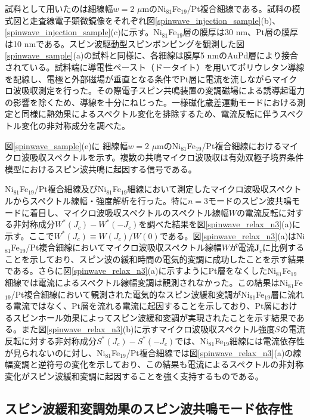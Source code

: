 試料として用いたのは細線幅$w=2$ $\mu$mのNi$_{81}$Fe$_{19}$/Pt複合細線である。試料の模式図と走査線電子顕微鏡像をそれぞれ図\ref{spinwave_injection_sample}(b)、\ref{spinwave_injection_sample}(c)に示す。Ni$_{81}$Fe$_{19}$層の膜厚は30 nm、Pt層の膜厚は10 nmである。スピン波駆動型スピンポンピングを観測した図\ref{spinwave_sample}(a)の試料と同様に、各細線は膜厚5 nmのAuPd層により接合されている。試料端に導電性ペースト（ドータイト）を用いてポリウレタン導線を配線し、電極と外部磁場が垂直となる条件でPt層に電流を流しながらマイクロ波吸収測定を行った。その際電子スピン共鳴装置の変調磁場による誘導起電力の影響を除くため、導線を十分にねじった。一様磁化歳差運動モードにおける測定と同様に熱効果によるスペクトル変化を排除するため、電流反転に伴うスペクトル変化の非対称成分を調べた。




図\ref{spinwave_sample}(e)に 細線幅$w=2$ $\mu$mのNi$_{81}$Fe$_{19}$/Pt複合細線におけるマイクロ波吸収スペクトルを示す。複数の共鳴マイクロ波吸収は有効双極子境界条件模型におけるスピン波共鳴に起因する信号である。



Ni$_{81}$Fe$_{19}$/Pt複合細線及びNi$_{81}$Fe$_{19}$細線において測定したマイクロ波吸収スペクトルからスペクトル線幅・強度解析を行った。特に$n=3$モードのスピン波共鳴モードに着目し、マイクロ波吸収スペクトルのスペクトル線幅$W$の電流反転に対する非対称成分$W^*(J_c)-W^* (-J_c)$を調べた結果を図\ref{spinwave_relax_n3}(a)に示す。ここで$W^*(J_c)\equiv W(J_c)/W(0)$である。図\ref{spinwave_relax_n3}(a)はNi$_{81}$Fe$_{19}$/Pt複合細線においてマイクロ波吸収スペクトル線幅$W$が電流$\bm{J}_c$に比例することを示しており、スピン波の緩和時間の電気的変調に成功したことを示す結果である。さらに図\ref{spinwave_relax_n3}(a)に示すようにPt層をなくしたNi$_{81}$Fe$_{19}$細線では電流によるスペクトル線幅変調は観測されなかった。この結果はNi$_{81}$Fe$_{19}$/Pt複合細線において観測された電気的なスピン波緩和変調がNi$_{81}$Fe$_{19}$層に流れる電流ではなく、Pt層を流れる電流に起因することを示しており、Pt層におけるスピンホール効果によってスピン波緩和変調が実現されたことを示す結果である。また図\ref{spinwave_relax_n3}(b)に示すマイクロ波吸収スペクトル強度$S$の電流反転に対する非対称成分$S^*(J_c)-S^*(-J_c)$では、Ni$_{81}$Fe$_{19}$細線には電流依存性が見られないのに対し、Ni$_{81}$Fe$_{19}$/Pt複合細線では図\ref{spinwave_relax_n3}(a)の線幅変調と逆符号の変化を示しており、この結果も電流によるスペクトルの非対称変化がスピン波緩和変調に起因することを強く支持するものである。

\subsection{スピン波緩和変調効果のスピン波共鳴モード依存性}


